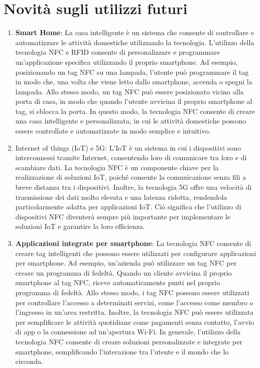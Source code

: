 \documentclass[a4paper,11pt]{report}
\begin{document}
\chapter{Novità sugli utilizzi futuri}
\begin{enumerate}
    \item \textbf{Smart Home}: La casa intelligente è un sistema che consente di controllare e automatizzare le attività domestiche utilizzando la tecnologia. L'utilizzo della tecnologia NFC e RFID consente di personalizzare e programmare un'applicazione specifica utilizzando il proprio smartphone. Ad esempio, posizionando un tag NFC su una lampada, l'utente può programmare il tag in modo che, una volta che viene letto dallo smartphone, accenda o spegni la lampada. Allo stesso modo, un tag NFC può essere posizionato vicino alla porta di casa, in modo che quando l'utente avvicina il proprio smartphone al tag, si sblocca la porta. In questo modo, la tecnologia NFC consente di creare una casa intelligente e personalizzata, in cui le attività domestiche possono essere controllate e automatizzate in modo semplice e intuitivo.
    \item Internet of things (IoT) e 5G: L'IoT è un sistema in cui i dispositivi sono interconnessi tramite Internet, consentendo loro di comunicare tra loro e di scambiare dati. La tecnologia NFC è un componente chiave per la realizzazione di soluzioni IoT, poiché consente la comunicazione senza fili a breve distanza tra i dispositivi. Inoltre, la tecnologia 5G offre una velocità di trasmissione dei dati molto elevata e una latenza ridotta, rendendola particolarmente adatta per applicazioni IoT. Ciò significa che l'utilizzo di dispositivi NFC diventerà sempre più importante per implementare le soluzioni IoT e garantire la loro efficienza.
    \item \textbf{Applicazioni integrate per smartphone}: La tecnologia NFC consente di creare tag intelligenti che possono essere utilizzati per configurare applicazioni per smartphone. Ad esempio, un'azienda può utilizzare un tag NFC per creare un programma di fedeltà. Quando un cliente avvicina il proprio smartphone al tag NFC, riceve automaticamente punti nel proprio programma di fedeltà. Allo stesso modo, i tag NFC possono essere utilizzati per controllare l'accesso a determinati servizi, come l'accesso come membro o l'ingresso in un'area restritta. Inoltre, la tecnologia NFC può essere utilizzata per semplificare le attività quotidiane come pagamenti senza contatto, l'avvio di app o la connessione ad un'apertura Wi-Fi. In generale, l'utilizzo della tecnologia NFC consente di creare soluzioni personalizzate e integrate per smartphone, semplificando l'interazione tra l'utente e il mondo che lo circonda.

\end{enumerate}
\end{document}
